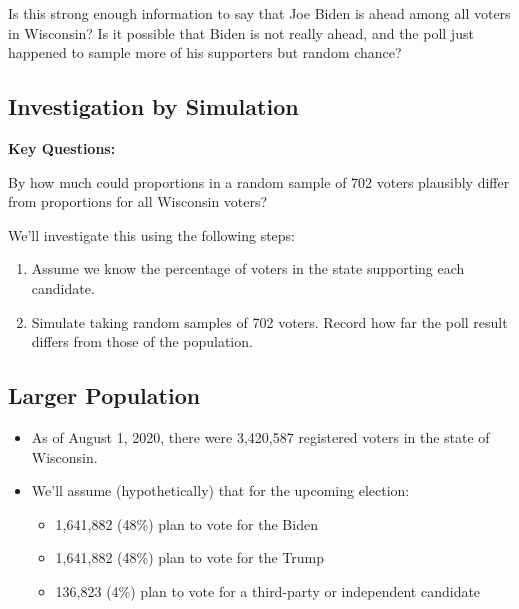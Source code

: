 \documentclass[]{book}
\providecommand{\tightlist}{%
  \setlength{\itemsep}{0pt}\setlength{\parskip}{0pt}}
\begin{document}
Is this strong enough information to say that Joe Biden is ahead among
all voters in Wisconsin? Is it possible that Biden is not really ahead,
and the poll just happened to sample more of his supporters but random
chance?

\subsection{Investigation by
Simulation}\label{investigation-by-simulation}

\textbf{Key Questions:}

By how much could proportions in a random sample of 702 voters plausibly
differ from proportions for all Wisconsin voters?

We'll investigate this using the following steps:

\begin{enumerate}
\def\labelenumi{\arabic{enumi}.}
\tightlist
\item
  Assume we know the percentage of voters in the state supporting each
  candidate.\\
\item
  Simulate taking random samples of 702 voters. Record how far the poll
  result differs from those of the population.
\end{enumerate}

\subsection{Larger Population}\label{larger-population}

\begin{itemize}
\item
  As of August 1, 2020, there were 3,420,587 registered voters in the
  state of Wisconsin.
\item
  We'll assume (hypothetically) that for the upcoming election:

  \begin{itemize}
  \tightlist
  \item
    1,641,882 (48\%) plan to vote for the Biden\\
  \item
    1,641,882 (48\%) plan to vote for the Trump\\
  \item
    136,823 (4\%) plan to vote for a third-party or independent
    candidate
  \end{itemize}
\end{itemize}
\end{document}
